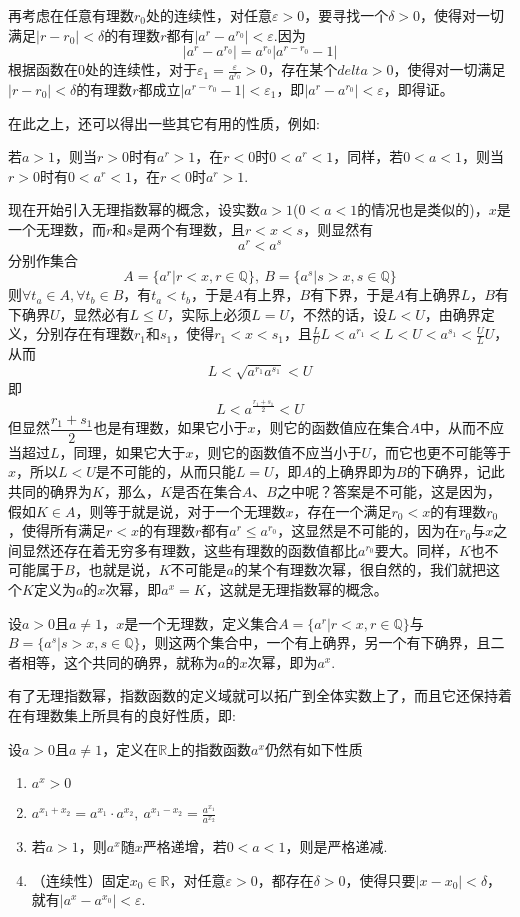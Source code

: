 再考虑在任意有理数$r_0$处的连续性，对任意$\varepsilon>0$，要寻找一个$\delta>0$，使得对一切满足$|r-r_0|<\delta$的有理数$r$都有$|a^r-a^{r_0}|<\varepsilon$.因为
\[ |a^r-a^{r_0}| = a^{r_0} |a^{r-r_0}-1| \]
根据函数在0处的连续性，对于$\varepsilon_1 = \frac{\varepsilon}{a^{r_0}}>0$，存在某个$delta>0$，使得对一切满足$|r-r_0|<\delta$的有理数$r$都成立$|a^{r-r_0}-1|<\varepsilon_1$，即$|a^r-a^{r_0}|<\varepsilon$，即得证。

在此之上，还可以得出一些其它有用的性质，例如:
\begin{inference}
  若$a>1$，则当$r>0$时有$a^r>1$，在$r<0$时$0<a^r<1$，同样，若$0<a<1$，则当$r>0$时有$0<a^r<1$，在$r<0$时$a^r>1$.
\end{inference}

现在开始引入无理指数幂的概念，设实数$a>1$($0<a<1$的情况也是类似的)，$x$是一个无理数，而$r$和$s$是两个有理数，且$r<x<s$，则显然有
\[ a^r<a^s \]
分别作集合
\[ A = \{ a^r | r<x,r \in \mathbb{Q} \}, \  B = \{ a^s | s>x,s \in \mathbb{Q} \} \]
则$\forall t_a \in A, \forall t_b \in B$，有$t_a<t_b$，于是$A$有上界，$B$有下界，于是$A$有上确界$L$，$B$有下确界$U$，显然必有$L\leqslant U$，实际上必须$L=U$，不然的话，设$L<U$，由确界定义，分别存在有理数$r_1$和$s_1$，使得$r_1<x<s_1$，且$\frac{L}{U}L<a^{r_1}<L<U<a^{s_1}<\frac{U}{L}U$，从而
\[ L<\sqrt{a^{r_1}a^{s_1}}<U \]
即
\[ L<a^{\frac{r_1+s_1}{2}}<U \]
但显然$\dfrac{r_1+s_1}{2}$也是有理数，如果它小于$x$，则它的函数值应在集合$A$中，从而不应当超过$L$，同理，如果它大于$x$，则它的函数值不应当小于$U$，而它也更不可能等于$x$，所以$L<U$是不可能的，从而只能$L=U$，即$A$的上确界即为$B$的下确界，记此共同的确界为$K$，那么，$K$是否在集合$A$、$B$之中呢？答案是不可能，这是因为，假如$K \in A$，则等于就是说，对于一个无理数$x$，存在一个满足$r_0<x$的有理数$r_0$，使得所有满足$r<x$的有理数$r$都有$a^r \leqslant a^{r_0}$，这显然是不可能的，因为在$r_0$与$x$之间显然还存在着无穷多有理数，这些有理数的函数值都比$a^{r_0}$要大。同样，$K$也不可能属于$B$，也就是说，$K$不可能是$a$的某个有理数次幂，很自然的，我们就把这个$K$定义为$a$的$x$次幂，即$a^x=K$，这就是无理指数幂的概念。

\begin{definition}
  设$a>0$且$a \neq 1$，$x$是一个无理数，定义集合$A=\{a^r|r<x,r \in \mathbb{Q} \}$与$B=\{a^s|s>x,s \in \mathbb{Q}\}$，则这两个集合中，一个有上确界，另一个有下确界，且二者相等，这个共同的确界，就称为$a$的$x$次幂，即为$a^x$.
\end{definition}

有了无理指数幂，指数函数的定义域就可以拓广到全体实数上了，而且它还保持着在有理数集上所具有的良好性质，即:
\begin{theorem}
  设$a>0$且$a \neq 1$，定义在$\mathbb{R}$上的指数函数$a^x$仍然有如下性质
\begin{enumerate}
\item $a^x>0$
\item $a^{x_1+x_2}=a^{x_1}\cdot a^{x_2}, \ a^{x_1-x_2} = \frac{a^{x_1}}{a^{x_2}} $
\item 若$a>1$，则$a^x$随$x$严格递增，若$0<a<1$，则是严格递减.
\item （连续性）固定$x_0\in \mathbb{R}$，对任意$\varepsilon>0$，都存在$\delta>0$，使得只要$|x-x_0|<\delta$，就有$|a^x-a^{x_0}|<\varepsilon$.
\end{enumerate}
\end{theorem}

